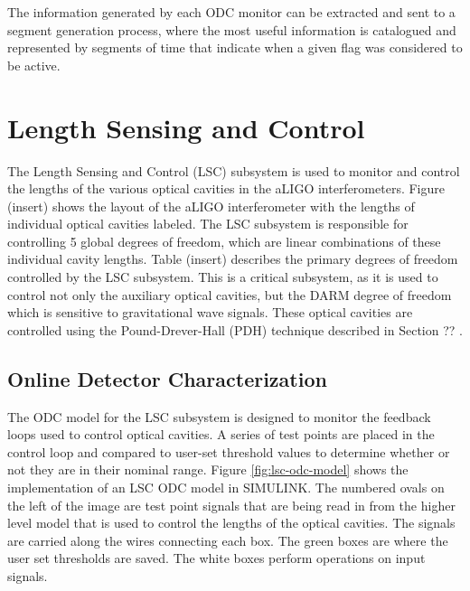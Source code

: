 The information generated by each ODC monitor can be extracted and sent to a segment
generation process, where the most useful information is catalogued and represented by
segments of time that indicate when a given flag was considered to be active.

\section{Length Sensing and Control}

The Length Sensing and Control (LSC) subsystem is 
used to monitor and control the lengths of the various optical cavities in the 
aLIGO interferometers. Figure (insert) shows the layout 
of the aLIGO interferometer with the lengths of individual optical cavities 
labeled. The LSC subsystem is responsible for controlling 5 global degrees of freedom, 
which are linear combinations of these individual cavity lengths. Table (insert) 
describes the primary degrees of freedom controlled by the LSC subsystem. 
This is a critical subsystem, as it is used to control
not only the auxiliary optical cavities, but the DARM degree of freedom which
is sensitive to gravitational wave signals.
These optical cavities are controlled using the Pound-Drever-Hall (PDH) 
technique described in Section ?? .

\subsection{Online Detector Characterization}

The ODC model for the LSC subsystem is designed to monitor the feedback 
loops used to control optical cavities. A series of test points are placed 
in the control loop and compared to user-set threshold values to determine 
whether or not they are in their nominal range. 
Figure \ref{fig:lsc-odc-model} shows the implementation of an LSC ODC 
model in SIMULINK. The numbered ovals on the left of the image are test point 
signals that are being read in from the higher level model that is used to control the 
lengths of the optical cavities. The signals are carried along the wires connecting 
each box. The green boxes are where the user set thresholds are saved. The white 
boxes perform operations on input signals.

